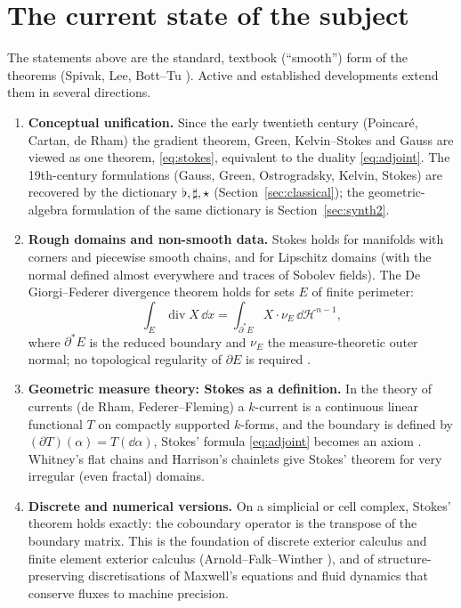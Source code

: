 \section{The current state of the subject}\label{sec:current}

The statements above are the standard, textbook (``smooth'') form of the theorems (Spivak, Lee, Bott--Tu \cite{Spivak,Lee,BottTu}). Active and established developments extend them in several directions.

\begin{enumerate}
\item \textbf{Conceptual unification.} Since the early twentieth century (Poincar\'e, Cartan, de Rham) the gradient theorem, Green, Kelvin--Stokes and Gauss are viewed as one theorem, \eqref{eq:stokes}, equivalent to the duality \eqref{eq:adjoint}. The 19th-century formulations (Gauss, Green, Ostrogradsky, Kelvin, Stokes) are recovered by the dictionary $\flat,\sharp,\star$ (Section~\ref{sec:classical}); the geometric-algebra formulation of the same dictionary is Section~\ref{sec:synth2}.
\item \textbf{Rough domains and non-smooth data.} Stokes holds for manifolds with corners and piecewise smooth chains, and for Lipschitz domains (with the normal defined almost everywhere and traces of Sobolev fields). The De Giorgi--Federer divergence theorem holds for sets $E$ of finite perimeter:
\[
\int_E\operatorname{div}X\,\dd x=\int_{\partial^*E}X\cdot\nu_E\,\dd\mathcal H^{n-1},
\]
where $\partial^*E$ is the reduced boundary and $\nu_E$ the measure-theoretic outer normal; no topological regularity of $\partial E$ is required \cite{EvansGariepy}.
\item \textbf{Geometric measure theory: Stokes as a definition.} In the theory of currents (de Rham, Federer--Fleming) a $k$-current is a continuous linear functional $T$ on compactly supported $k$-forms, and the boundary is defined by $(\partial T)(\alpha)=T(\dd\alpha)$, \ie Stokes' formula \eqref{eq:adjoint} becomes an axiom \cite{Federer}. Whitney's flat chains and Harrison's chainlets \cite{Harrison} give Stokes' theorem for very irregular (even fractal) domains.
\item \textbf{Discrete and numerical versions.} On a simplicial or cell complex, Stokes' theorem holds exactly: the coboundary operator is the transpose of the boundary matrix. This is the foundation of discrete exterior calculus and finite element exterior calculus (Arnold--Falk--Winther \cite{AFW}), and of structure-preserving discretisations of Maxwell's equations and fluid dynamics that conserve fluxes to machine precision.

\end{enumerate}
